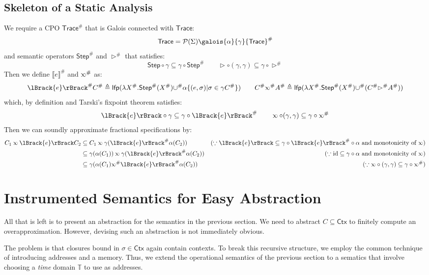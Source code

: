 \documentclass[acmsmall,screen,review]{acmart}\settopmatter{printfolios=true,printccs=false,printacmref=false}
\theoremstyle{acmdefinition}
\newcommand*{\pset}{\mathcal{P}}
\newcommand*{\Abs}[1]{{#1}^{\#}}
\newcommand*{\Time}{\mathbb{T}}
\newcommand*{\ctx}{\sigma}
\newcommand*{\Ctx}{\mathsf{Ctx}}
\newcommand*{\Trace}{\mathsf{Trace}}
\newcommand*{\lfp}{\mathsf{lfp}}
\newcommand*{\Step}{\mathsf{Step}}
\newcommand*{\semlink}{\mathbin{\rotatebox[origin=c]{180}{$\propto$}}}
\newcommand*{\sembracket}[1]{\lBrack{#1}\rBrack}
\begin{document}
\subsection{Skeleton of a Static Analysis}
We require a CPO $\Abs{\Trace}$ that is Galois connected with $\Trace$:
\[\Trace=\pset(\Sigma)\galois{\alpha}{\gamma}\Abs{\Trace}\]
and semantic operators $\Abs\Step$ and $\Abs\rhd$ that satisfies:
\[\Step\circ\gamma\subseteq\gamma\circ\Abs\Step\qquad\rhd\circ(\gamma,\gamma)\subseteq\gamma\circ\Abs\rhd\]
Then we define $\Abs{\sembracket{e}}$ and $\Abs\semlink$ as:
\[
  \Abs{\sembracket{e}}\Abs{C}\triangleq\lfp(\lambda\Abs{X}.\Abs\Step(\Abs{X})\Abs\cup\alpha\{(e,\ctx)|\ctx\in\gamma\Abs{C}\})\qquad
  \Abs{C}\Abs\semlink\Abs{A}\triangleq\lfp(\lambda\Abs{X}.\Abs\Step(\Abs{X})\Abs\cup(\Abs{C}\Abs\rhd\Abs{A}))
\]
which, by definition and Tarski's fixpoint theorem satisfies:
\[\sembracket{e}\circ\gamma\subseteq\gamma\circ\Abs{\sembracket{e}}\qquad\semlink\circ(\gamma,\gamma)\subseteq\gamma\circ\Abs\semlink\]
Then we can soundly approximate fractional specifications by:
\begin{align*}
  C_1\semlink\sembracket{e}C_2 & \subseteq C_1\semlink\gamma(\Abs{\sembracket{e}}\alpha(C_2))                 & (\because\sembracket{e}\subseteq\gamma\circ\Abs{\sembracket{e}}\circ\alpha\text{ and monotonicity of }\semlink) \\
                               & \subseteq \gamma(\alpha(C_1))\semlink\gamma(\Abs{\sembracket{e}}\alpha(C_2)) & (\because\text{id}\subseteq\gamma\circ\alpha\text{ and monotonicity of }\semlink)                               \\
                               & \subseteq\gamma(\alpha(C_1)\Abs\semlink\Abs{\sembracket{e}}\alpha(C_2))      & (\because\semlink\circ(\gamma,\gamma)\subseteq\gamma\circ\Abs\semlink)
\end{align*}
\section{Instrumented Semantics for Easy Abstraction}
All that is left is to present an abstraction for the semantics in the previous section.
We need to abstract $C\subseteq\Ctx$ to finitely compute an overapproximation.
However, devising such an abstraction is not immediately obvious.

The problem is that closures bound in $\ctx\in\Ctx$ again contain contexts.
To break this recursive structure, we employ the common technique of introducing addresses and a memory.
Thus, we extend the operational semantics of the previous section to a sematics that involve choosing a \emph{time} domain $\Time$ to use as addresses.
\end{document}
